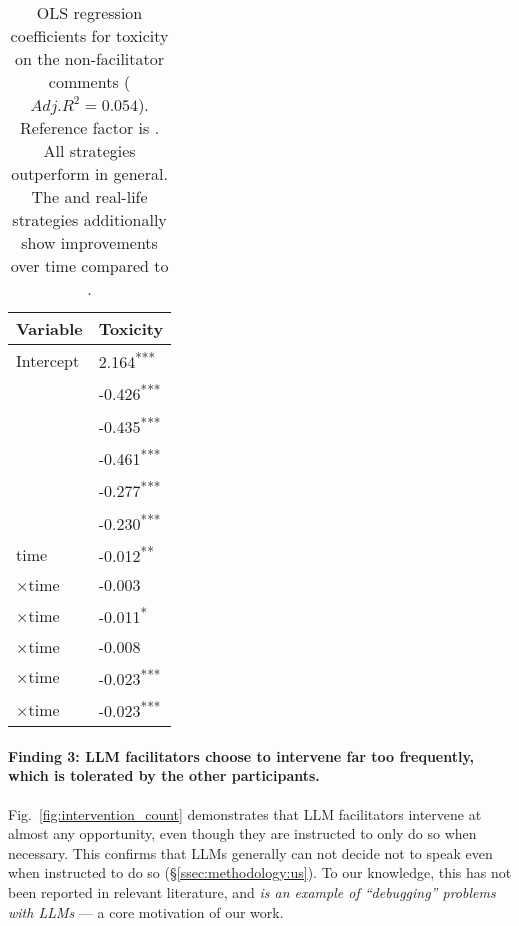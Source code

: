 \begin{table}[t]
	\centering
	\begin{tabular}{p{5cm} p{1.5cm}}
		\toprule
		\textbf{Variable} & \textbf{Toxicity} \\
		\midrule
		Intercept & 2.164\textsuperscript{***} \\
		\strategynoinstr & -0.426\textsuperscript{***} \\
		\strategymodgame & -0.435\textsuperscript{***} \\
		\strategyrules & -0.461\textsuperscript{***} \\
		\strategyregroom & -0.277\textsuperscript{***} \\
		\strategyconstrcomm & -0.230\textsuperscript{***} \\
		time & -0.012\textsuperscript{**} \\
		\strategynoinstr$\times$time & -0.003 \\
		\strategymodgame$\times$time & -0.011\textsuperscript{*} \\
		\strategyrules$\times$time & -0.008 \\
		\strategyregroom$\times$time & -0.023\textsuperscript{***} \\
		\strategyconstrcomm$\times$time & -0.023\textsuperscript{***} \\
		\bottomrule
	\end{tabular}
	\small
	\asterisknote
	\normalsize
	\caption{OLS regression coefficients for toxicity on the non-facilitator comments ($Adj. R^2=0.054$). Reference factor is \textit{\strategynomod}. All strategies outperform \textit{\strategynomod} in general. The \textit{\strategyregroom} and \textit{\strategyconstrcomm} real-life strategies additionally show improvements over time compared to \textit{\strategynomod}.}
	\label{tab:toxicity}
\end{table}


\paragraph{Finding 3: LLM facilitators choose to intervene far too frequently, which is tolerated by the other participants.} Fig.~\ref{fig:intervention_count} demonstrates that LLM facilitators intervene at almost any opportunity, even though they are instructed to only do so when necessary. This confirms that LLMs generally can not decide not to speak even when instructed to do so  (\S\ref{ssec:methodology:us}). To our knowledge, this has not been reported in relevant literature, and \emph{is an example of ``debugging'' problems with LLMs} --- a core motivation of our work.

